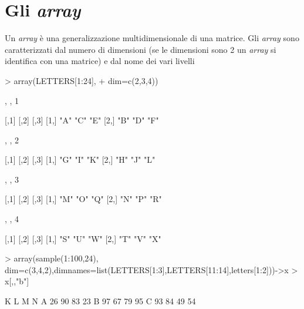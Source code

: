 \documentclass[onecolumn,11pt]{book}
\begin{document}
\section{Gli \emph{array}}
Un \emph{array}  \`e una generalizzazione multidimensionale di una matrice. Gli \emph{array} sono caratterizzati dal numero di dimensioni  (se le dimensioni sono 2 un \emph{array} si identifica con una  matrice) e dal nome dei vari livelli
\begin{Schunk}
\begin{Sinput}
> array(LETTERS[1:24],
+ dim=c(2,3,4))
\end{Sinput}
\begin{Soutput}
, , 1

     [,1] [,2] [,3]
[1,] "A"  "C"  "E" 
[2,] "B"  "D"  "F" 

, , 2

     [,1] [,2] [,3]
[1,] "G"  "I"  "K" 
[2,] "H"  "J"  "L" 

, , 3

     [,1] [,2] [,3]
[1,] "M"  "O"  "Q" 
[2,] "N"  "P"  "R" 

, , 4

     [,1] [,2] [,3]
[1,] "S"  "U"  "W" 
[2,] "T"  "V"  "X" 
\end{Soutput}
\begin{Sinput}
> array(sample(1:100,24), dim=c(3,4,2),dimnames=list(LETTERS[1:3],LETTERS[11:14],letters[1:2]))->x
> x[,,"b"]
\end{Sinput}
\begin{Soutput}
   K  L  M  N
A 26 90 83 23
B 97 67 79 95
C 93 84 49 54
\end{Soutput}
\end{Schunk}
\end{document}
